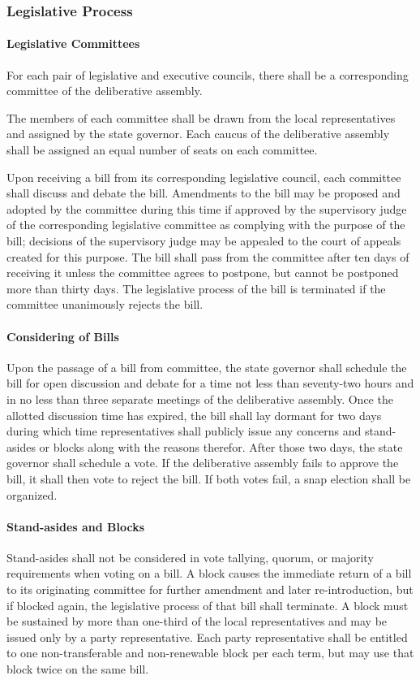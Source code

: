 \documentclass{article}
\begin{document}
\subsubsection{Legislative Process}
\paragraph{Legislative Committees}
For each pair of legislative and executive councils, there shall be a corresponding committee of the deliberative assembly.

The members of each committee shall be drawn from the local representatives and assigned by the state governor. Each caucus of the deliberative assembly shall be assigned an equal number of seats on each committee. 

Upon receiving a bill from its corresponding legislative council, each committee shall discuss and debate the bill. Amendments to the bill may be proposed and adopted by the committee during this time if approved by the supervisory judge of the corresponding legislative committee as complying with the purpose of the bill; decisions of the supervisory judge may be appealed to the court of appeals created for this purpose. The bill shall pass from the committee after ten days of receiving it unless the committee agrees to postpone, but cannot be postponed more than thirty days. The legislative process of the bill is terminated if the committee unanimously rejects the bill.
\paragraph{Considering of Bills}
Upon the passage of a bill from committee, the state governor shall schedule the bill for open discussion and debate for a time not less than seventy-two hours and in no less than three separate meetings of the deliberative assembly. Once the allotted discussion time has expired, the bill shall lay dormant for two days during which time representatives shall publicly issue any concerns and stand-asides or blocks along with the reasons therefor. After those two days, the state governor shall schedule a vote. If the deliberative assembly fails to approve the bill, it shall then vote to reject the bill. If both votes fail, a snap election shall be organized.
\paragraph{Stand-asides and Blocks}
Stand-asides shall not be considered in vote tallying, quorum, or majority requirements when voting on a bill. A block causes the immediate return of a bill to its originating committee for further amendment and later re-introduction, but if blocked again, the legislative process of that bill shall terminate. A block must be sustained by more than one-third of the local representatives and may be issued only by a party representative. Each party representative shall be entitled to one non-transferable and non-renewable block per each term, but may use that block twice on the same bill.
\end{document}
